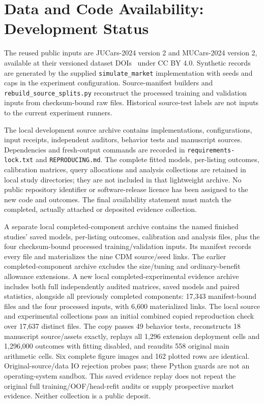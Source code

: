 \documentclass[pdflatex,sn-nature]{sn-jnl}
\begin{document}
\section{Data and Code Availability: Development Status}
The reused public inputs are JUCars-2024 version 2 and MUCars-2024 version 2,
available at their versioned dataset DOIs~\cite{thalji2026jucars,tabarnoust2024mucars}
under CC BY 4.0. Synthetic records are generated by the supplied
\texttt{simulate\_market} implementation with seeds and caps in the experiment
configuration. Source-manifest builders and
\texttt{rebuild\_source\_splits.py} reconstruct the processed training and
validation inputs from checksum-bound raw files. Historical source-test
labels are not inputs to the current experiment runners.

The local development source archive contains implementations, configurations,
input receipts, independent auditors, behavior tests and manuscript sources.
Dependencies and fresh-output commands are recorded in
\texttt{requirements-lock.txt} and \texttt{REPRODUCING.md}. The complete fitted
models, per-listing outcomes, calibration matrices, query allocations and
analysis collections are retained in local study directories; they are not
included in that lightweight archive. No public repository identifier or
software-release licence has been assigned to the new code and outcomes.
The final availability statement must match the completed, actually attached
or deposited evidence collection.

A separate local completed-component archive contains the named finished
studies' saved models, per-listing outcomes, calibration and analysis files,
plus the four checksum-bound processed training/validation inputs. Its
manifest records every file and materializes the nine CDM source/seed links.
The earlier completed-component archive excludes the size/tuning and
ordinary-benefit allowance extensions. A new local completed-experimental
evidence archive includes both full independently audited matrices, saved
models and paired statistics, alongside all previously completed components:
17,343 manifest-bound files and the four processed inputs, with 6,600
materialized links. The local source and experimental collections pass an initial combined copied
reproduction check over 17,637 distinct files. The copy passes 49 behavior
tests, reconstructs 18 manuscript source/assets exactly, replays all 1,296
extension deployment cells and 1,296,000 outcomes with fitting disabled,
and reaudits 558 original main arithmetic cells. Six complete figure images
and 162 plotted rows are identical. Original-source/data IO rejection probes
pass; these Python guards are not an operating-system sandbox. This saved
evidence replay does not repeat the original full training/OOF/head-refit
audits or supply prospective market evidence. Neither collection is a
public deposit.
\end{document}
